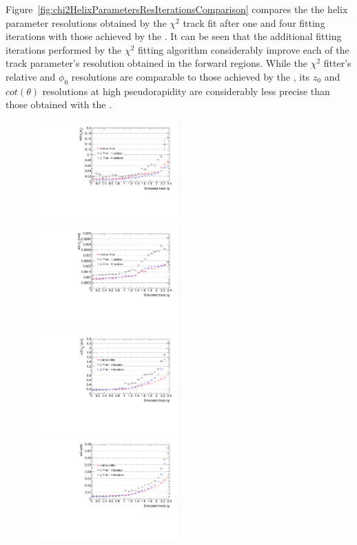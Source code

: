 Figure~\ref{fig:chi2HelixParametersResIterationsComparison} compares the the helix parameter resolutions obtained by the $\chi^{2}$ track fit after one and four fitting iterations with those achieved by the \KF.
It can be seen that the additional fitting iterations performed by the $\chi^{2}$ fitting algorithm considerably improve each of the track parameter's resolution obtained in the forward regions.
While the  $\chi^{2}$ fitter's \pt relative and $\phi_{0}$ resolutions are comparable to those achieved by the \KF, its $z_{0}$ and $cot(\theta)$ resolutions at high pseudorapidity are considerably less precise than those obtained with the \KF.

\begin{figure}[htb]
\centering
\includegraphics[width=0.495\textwidth]{figs/tk-upgrade/results-chi2fitter/ptRelResVsEta_IterationComparison.pdf}
\includegraphics[width=0.495\textwidth]{figs/tk-upgrade/results-chi2fitter/phi0ResVsEta_IterationComparison.pdf}
\\
\includegraphics[width=0.495\textwidth]{figs/tk-upgrade/results-chi2fitter/z0ResVsEta_IterationComparison.pdf}
\includegraphics[width=0.495\textwidth]{figs/tk-upgrade/results-chi2fitter/cotThetaResVsEta_IterationComparison.pdf}

\end{figure}
